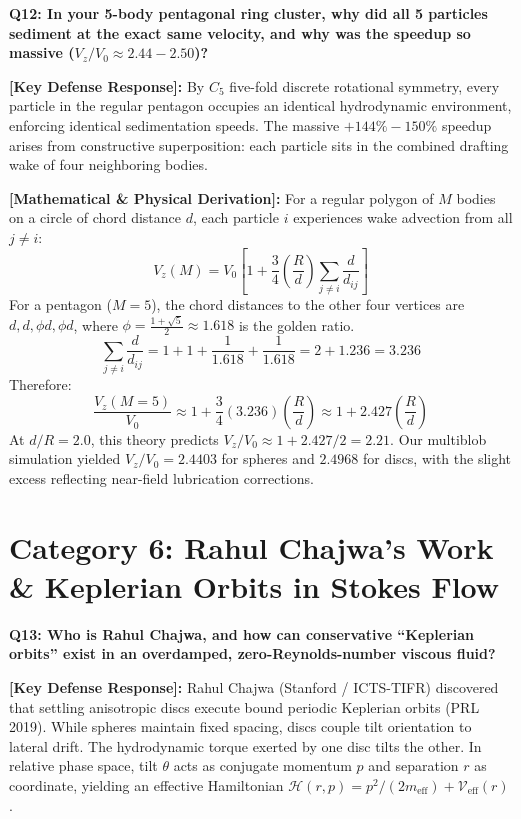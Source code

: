 \documentclass[11pt,a4paper]{article}
\newcommand{\question}[2]{
    \vspace{0.4cm}
    \noindent\colorbox{blue!10}{\parbox{\dimexpr\textwidth-2\fboxsep\relax}{
        \textbf{#1: #2}
    }}
    \vspace{0.2cm}
}
\newcommand{\shortanswer}[1]{
    \noindent\textbf{\textcolor{green!50!black}{[Key Defense Response]:}} #1
    \vspace{0.2cm}
}
\newcommand{\deepdetails}[1]{
    \noindent\textbf{\textcolor{blue!60!black}{[Mathematical \& Physical Derivation]:}} #1
    \vspace{0.2cm}
}
\begin{document}
\vspace{0.4cm}
\question{Q12}{In your 5-body pentagonal ring cluster, why did all 5 particles sediment at the exact same velocity, and why was the speedup so massive ($V_z / V_0 \approx 2.44 - 2.50$)?}

\shortanswer{By $C_5$ five-fold discrete rotational symmetry, every particle in the regular pentagon occupies an identical hydrodynamic environment, enforcing identical sedimentation speeds. The massive $+144\% - 150\%$ speedup arises from constructive superposition: each particle sits in the combined drafting wake of four neighboring bodies.}

\deepdetails{
For a regular polygon of $M$ bodies on a circle of chord distance $d$, each particle $i$ experiences wake advection from all $j \ne i$:
\begin{equation}
    V_z(M) = V_0 \left[ 1 + \frac{3}{4}\left(\frac{R}{d}\right) \sum_{j \ne i} \frac{d}{d_{ij}} \right]
\end{equation}
For a pentagon ($M = 5$), the chord distances to the other four vertices are $d, d, \phi d, \phi d$, where $\phi = \frac{1+\sqrt{5}}{2} \approx 1.618$ is the golden ratio.
\begin{equation}
    \sum_{j \ne i} \frac{d}{d_{ij}} = 1 + 1 + \frac{1}{1.618} + \frac{1}{1.618} = 2 + 1.236 = 3.236
\end{equation}
Therefore:
\begin{equation}
    \frac{V_z(M=5)}{V_0} \approx 1 + \frac{3}{4} (3.236) \left(\frac{R}{d}\right) \approx 1 + 2.427 \left(\frac{R}{d}\right)
\end{equation}
At $d/R = 2.0$, this theory predicts $V_z / V_0 \approx 1 + 2.427/2 = 2.21$. Our multiblob simulation yielded $V_z / V_0 = 2.4403$ for spheres and $2.4968$ for discs, with the slight excess reflecting near-field lubrication corrections.
}

\section{Category 6: Rahul Chajwa's Work \& Keplerian Orbits in Stokes Flow}

\question{Q13}{Who is Rahul Chajwa, and how can conservative ``Keplerian orbits'' exist in an overdamped, zero-Reynolds-number viscous fluid?}

\shortanswer{Rahul Chajwa (Stanford / ICTS-TIFR) discovered that settling anisotropic discs execute bound periodic Keplerian orbits (PRL 2019). While spheres maintain fixed spacing, discs couple tilt orientation to lateral drift. The hydrodynamic torque exerted by one disc tilts the other. In relative phase space, tilt $\theta$ acts as conjugate momentum $p$ and separation $r$ as coordinate, yielding an effective Hamiltonian $\mathcal{H}(r, p) = p^2/(2m_{\text{eff}}) + \mathcal{V}_{\text{eff}}(r)$.}
\end{document}
